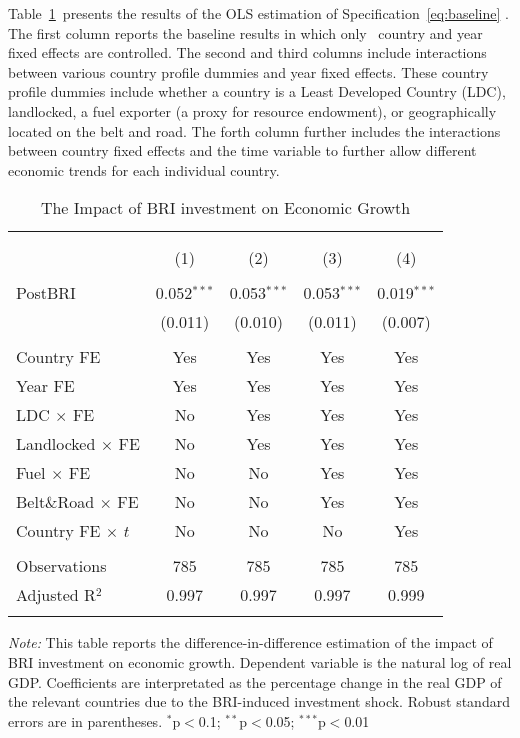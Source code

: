 \documentclass[10pt,a4paper]{article}
\begin{document}
Table~{\ref{tab:baseline}}~presents the results of the
OLS estimation of Specification~{\ref{eq:baseline}} .
The first column reports the baseline results in which only ~country and
year fixed effects are controlled. The second and third columns include
interactions between various country profile dummies and year fixed
effects. These country profile dummies include whether a country is a
Least Developed Country (LDC), landlocked, a fuel exporter (a proxy for
resource endowment), or geographically located on the belt and road. The
forth column further includes the interactions between country fixed
effects and the time variable to further allow different economic trends
for each individual country.~
\begin{table}[!htbp] \centering
  \caption{{The Impact of BRI investment on Economic Growth}}
  \label{tab:baseline}
\begin{tabular}{@{\extracolsep{5pt}}lcccc}
\\[-1.8ex]\hline
\hline \\[-1.8ex]
\\[-1.8ex] & (1) & (2) & (3) & (4)\\
\hline \\[-1.8ex]
 PostBRI & 0.052$^{***}$ & 0.053$^{***}$ & 0.053$^{***}$ & 0.019$^{***}$ \\
  & (0.011) & (0.010) & (0.011) & (0.007) \\
  & & & & \\

Country FE & Yes & Yes & Yes & Yes \\
Year FE & Yes & Yes & Yes & Yes \\
LDC $\times$ FE & No & Yes & Yes & Yes \\
Landlocked $\times$ FE & No & Yes & Yes & Yes \\
Fuel $\times$ FE & No & No & Yes & Yes \\
Belt\&Road $\times$ FE & No & No & Yes & Yes \\
Country FE $\times$ $t$ & No & No & No & Yes \\

\hline \\[-1.8ex]
Observations & 785 & 785 & 785 & 785 \\
Adjusted R$^{2}$ & 0.997 & 0.997 & 0.997 & 0.999 \\
\hline
\hline \\[-1.8ex]
\end{tabular}

\begin{flushleft}
\textit{Note:} This table reports the difference-in-difference
estimation of the impact of BRI investment on economic growth.
Dependent variable is the natural log of real GDP.
Coefficients are interpretated as the percentage change in the  real GDP of the relevant countries due to the BRI-induced investment shock.
Robust standard errors are in parentheses.
$^{*}$p$<$0.1; $^{**}$p$<$0.05; $^{***}$p$<$0.01
\end{flushleft}

\end{table}
\end{document}
